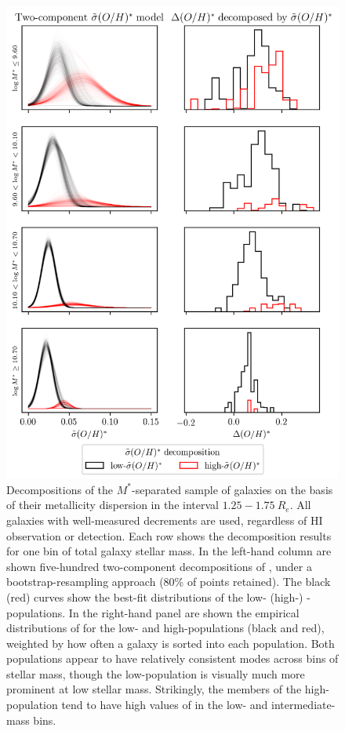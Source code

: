 \begin{figure}
    \centering
    \includegraphics{sigma2comp_dec01_subplotmstar}
    \caption[Two-component decompositions of stellar mass bins' distributions by their scatter of their metallicity distribution at fixed radius.]{Decompositions of the $M^*$-separated sample of galaxies on the basis of their metallicity dispersion in the interval $1.25-1.75 ~ R_e$. All galaxies with well-measured decrements are used, regardless of HI observation or detection. Each row shows the decomposition results for one bin of total galaxy stellar mass. In the left-hand column are shown five-hundred two-component decompositions of \metdisp, under a bootstrap-resampling approach (80\% of points retained). The black (red) curves show the best-fit distributions of the low- (high-) -\metdisp populations. In the right-hand panel are shown the empirical distributions of \metdec for the low- and high-\metdisp populations (black and red), weighted by how often a galaxy is sorted into each population. Both populations appear to have relatively consistent modes across bins of stellar mass, though the low-\metdisp population is visually much more prominent at low stellar mass. Strikingly, the members of the high-\metdisp population tend to have high values of \metdec in the low- and intermediate-mass bins.}
    \label{fig:decomposition}
\end{figure}

